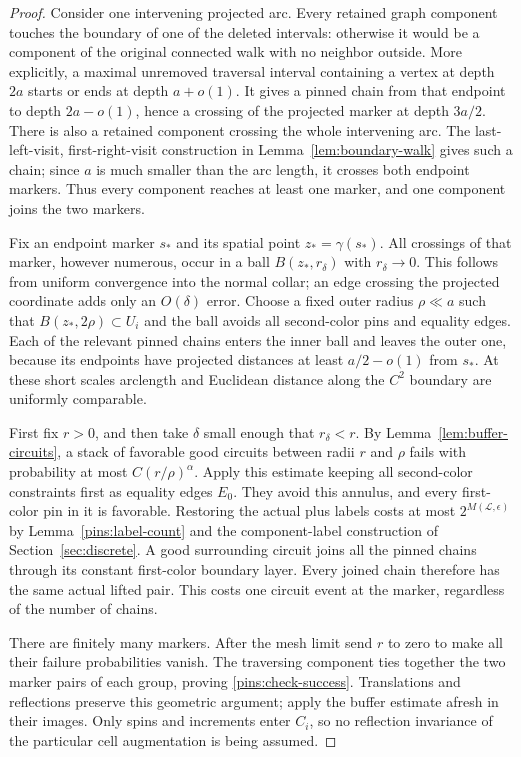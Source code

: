 \begin{proof}
Consider one intervening projected arc.  Every retained graph component
touches the boundary of one of the deleted intervals: otherwise it would
be a component of the original connected walk with no neighbor outside.
More explicitly, a maximal unremoved traversal interval containing a
vertex at depth $2a$ starts or ends at depth $a+o(1)$.  It gives a
pinned chain from that endpoint to depth $2a-o(1)$, hence a crossing
of the projected marker at depth $3a/2$.  There is also a retained
component crossing the whole intervening arc.  The last-left-visit,
first-right-visit construction in Lemma~\ref{lem:boundary-walk} gives
such a chain; since $a$ is much smaller than the arc length, it crosses
both endpoint markers.  Thus every component reaches at least one
marker, and one component joins the two markers.

Fix an endpoint marker $s_*$ and its spatial point $z_* =\gamma(s_*)$.
All crossings of that marker, however numerous, occur in a ball
$B(z_*,r_\delta)$ with $r_\delta\to0$.  This follows from uniform
convergence into the normal collar; an edge crossing the projected
coordinate adds only an $O(\delta)$ error.  Choose a fixed outer radius
$\rho\ll a$ such that $B(z_*,2\rho)\subset U_i$ and the ball avoids
all second-color pins and equality edges.  Each of the relevant pinned
chains enters the inner ball and leaves the outer one, because its
endpoints have projected distances at least $a/2-o(1)$ from $s_*$.
At these short scales arclength and Euclidean distance along the
$C^2$ boundary are uniformly comparable.

First fix $r>0$, and then take $\delta$ small enough that $r_\delta<r$.
By Lemma~\ref{lem:buffer-circuits}, a stack of favorable good circuits
between radii $r$ and $\rho$ fails with probability at most
$C(r/\rho)^\alpha$.  Apply this estimate keeping all second-color
constraints first as equality edges $E_0$.  They avoid this annulus,
and every first-color pin in it is favorable.  Restoring the actual
plus labels costs at most $2^{M(\mathcal L,\epsilon)}$ by
Lemma~\ref{pins:label-count} and the component-label construction of
Section~\ref{sec:discrete}.  A good surrounding circuit joins all the
pinned chains through its constant first-color boundary layer.  Every
joined chain therefore has the same actual lifted pair.  This costs
one circuit event at the marker, regardless of the number of chains.

There are finitely many markers.  After the mesh limit send $r$ to
zero to make all their failure probabilities vanish.  The traversing
component ties together the two marker pairs of each group, proving
\eqref{pins:check-success}.  Translations and reflections preserve this
geometric argument; apply the buffer estimate afresh in their images.
Only spins and increments enter $C_i$, so no reflection invariance of
the particular cell augmentation is being assumed.
\end{proof}

